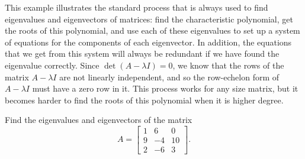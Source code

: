 This example illustrates the standard process that is always used to find eigenvalues and eigenvectors of matrices: find the characteristic polynomial, get the roots of this polynomial, and use each of these eigenvalues to set up a system of equations for the components of each eigenvector. In addition, the equations that we get from this system will always be redundant if we have found the eigenvalue correctly. Since $\det(A - \lambda I) = 0$, we know that the rows of the matrix $A - \lambda I$ are not linearly independent, and so the row-echelon form of $A - \lambda I$ must have a zero row in it. This process works for any size matrix, but it becomes harder to find the roots of this polynomial when it is higher degree. 

\begin{example}
Find the eigenvalues and eigenvectors of the matrix
\[ A = \begin{bmatrix} 1 & 6 & 0 \\ 9 & -4 & 10 \\ 2 & -6 & 3 \end{bmatrix}. \]
\end{example}

